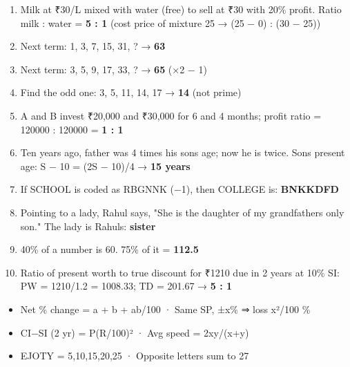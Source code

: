 \begin{enumerate}
\def\labelenumi{\arabic{enumi}.}
\setcounter{enumi}{18}
\tightlist
\item
  Milk at ₹30/L mixed with water (free) to sell at ₹30 with 20\% profit. Ratio milk : water = \textbf{5 : 1} (cost price of mixture 25 → (25 − 0) : (30 − 25))
\item
  Next term: 1, 3, 7, 15, 31, ? → \textbf{63}
\item
  Next term: 3, 5, 9, 17, 33, ? → \textbf{65} (×2 − 1)
\item
  Find the odd one: 3, 5, 11, 14, 17 → \textbf{14} (not prime)
\item
  A and B invest ₹20,000 and ₹30,000 for 6 and 4 months; profit ratio = 120000 : 120000 = \textbf{1 : 1}
\item
  Ten years ago, father was 4 times his son\textquotesingle s age; now he is twice. Son\textquotesingle s present age: S − 10 = (2S − 10)/4 → \textbf{15 years}
\item
  If \textquotesingle SCHOOL\textquotesingle{} is coded as \textquotesingle RBGNNK\textquotesingle{} (−1), then \textquotesingle COLLEGE\textquotesingle{} is: \textbf{BNKKDFD}
\item
  Pointing to a lady, Rahul says, "She is the daughter of my grandfather\textquotesingle s only son." The lady is Rahul\textquotesingle s: \textbf{sister}
\item
  40\% of a number is 60. 75\% of it = \textbf{112.5}
\item
  Ratio of present worth to true discount for ₹1210 due in 2 years at 10\% SI: PW = 1210/1.2 = 1008.33; TD = 201.67 → \textbf{5 : 1}
\end{enumerate}

\begin{revbox}

\begin{itemize}
\tightlist
\item
  Net \% change = a + b + ab/100 · Same SP, ±x\% ⇒ loss x²/100 \%
\item
  CI−SI (2 yr) = P(R/100)² · Avg speed = 2xy/(x+y)
\item
  EJOTY = 5,10,15,20,25 · Opposite letters sum to 27
\end{itemize}

\end{revbox}
